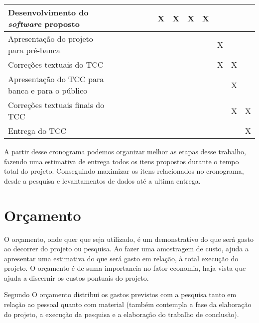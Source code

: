 \begin{table} [h]
\begin{small}
\begin{tabular}{|p{3.2in}|c|c|c|c|c|c|c|c|c|c|c|c|}
    Desenvolvimento do \textit{software} proposto &&&&&&X&X&X&X&&&\\\hline
    
    Apresentação do projeto para pré-banca &&&&&&&&&&X&&\\\hline
    
    Correções textuais do TCC &&&&&&&&&&X&X&\\\hline
    
    Apresentação do TCC para banca e para o público &&&&&&&&&&&X&\\\hline
    
    Correções textuais finais do TCC &&&&&&&&&&&X&X\\\hline
    
    Entrega do TCC &&&&&&&&&&&&X\\\hline
  
  \end{tabular}
  
  \end{small}
  
\end{table}

	\par A partir desse cronograma podemos organizar melhor as etapas desse
trabalho, fazendo uma estimativa de entrega todos os itens propostos durante o
tempo total do projeto. Conseguindo maximizar os itens relacionados no
cronograma, desde a pesquisa e levantamentos de dados até a ultima entrega.



\pagebreak
\section{Orçamento}

	\par O orçamento, onde quer que seja utilizado, é um demonstrativo do que será
gasto ao decorrer do projeto ou pesquisa. Ao fazer uma amostragem de custo,
ajuda a apresentar uma estimativa do que será gasto em relação, à total execução
do projeto. O orçamento é de suma importancia no fator economia, haja vista que
ajuda a discernir os custos pontuais do projeto.

	\par Segundo  O orçamento distribui os gastos
previstos com a pesquisa tanto em relação ao pessoal quanto com material
(também contempla a fase da elaboração do projeto, a execução da pesquisa e a
elaboração do trabalho de conclusão).

